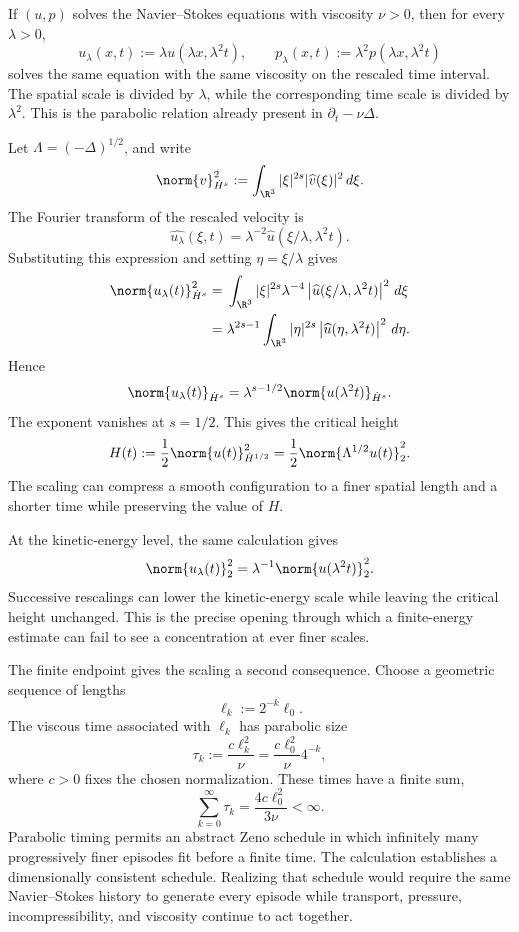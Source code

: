 If \((u,p)\) solves the Navier--Stokes equations with viscosity \(\nu>0\), then for every \(\lambda>0\),
\[
  u_\lambda(x,t)
  :=
  \lambda u(\lambda x,\lambda^2t),
  \qquad
  p_\lambda(x,t)
  :=
  \lambda^2p(\lambda x,\lambda^2t)
\]
solves the same equation with the same viscosity on the rescaled time interval.
The spatial scale is divided by \(\lambda\), while the corresponding time scale is divided by \(\lambda^2\).
This is the parabolic relation already present in \(\partial_t-\nu\Delta\).

Let \(\Lambda=(-\Delta)^{1/2}\), and write
\[
  \norm{v}_{\dot H^s}^2
  :=
  \int_{\R^3}
  |\xi|^{2s}|\widehat v(\xi)|^2
  \,d\xi.
\]
The Fourier transform of the rescaled velocity is
\[
  \widehat{u_\lambda}(\xi,t)
  =
  \lambda^{-2}
  \widehat u(\xi/\lambda,\lambda^2t).
\]
Substituting this expression and setting \(\eta=\xi/\lambda\) gives
\begin{align*}
  \norm{u_\lambda(t)}_{\dot H^s}^2
  &={}
  \int_{\R^3}
  |\xi|^{2s}\lambda^{-4}
  \left|\widehat u(\xi/\lambda,\lambda^2t)\right|^2
  \,d\xi
  \\
  &={}
  \lambda^{2s-1}
  \int_{\R^3}
  |\eta|^{2s}
  \left|\widehat u(\eta,\lambda^2t)\right|^2
  \,d\eta.
\end{align*}
Hence
\[
  \norm{u_\lambda(t)}_{\dot H^s}
  =
  \lambda^{s-1/2}
  \norm{u(\lambda^2t)}_{\dot H^s}.
\]
The exponent vanishes at \(s=1/2\).
This gives the critical height
\[
  H(t)
  :=
  \frac12\norm{u(t)}_{\dot H^{1/2}}^2
  =
  \frac12\norm{\Lambda^{1/2}u(t)}_2^2.
\]
The scaling can compress a smooth configuration to a finer spatial length and a shorter time while preserving the value of \(H\).

At the kinetic-energy level, the same calculation gives
\[
  \norm{u_\lambda(t)}_2^2
  =
  \lambda^{-1}
  \norm{u(\lambda^2t)}_2^2.
\]
Successive rescalings can lower the kinetic-energy scale while leaving the critical height unchanged.
This is the precise opening through which a finite-energy estimate can fail to see a concentration at ever finer scales.

The finite endpoint gives the scaling a second consequence.
Choose a geometric sequence of lengths
\[
  \ell_k
  :=
  2^{-k}\ell_0.
\]
The viscous time associated with \(\ell_k\) has parabolic size
\[
  \tau_k
  :=
  \frac{c\ell_k^2}{\nu}
  =
  \frac{c\ell_0^2}{\nu}4^{-k},
\]
where \(c>0\) fixes the chosen normalization.
These times have a finite sum,
\[
  \sum_{k=0}^{\infty}\tau_k
  =
  \frac{4c\ell_0^2}{3\nu}
  <
  \infty.
\]
Parabolic timing permits an abstract Zeno schedule in which infinitely many progressively finer episodes fit before a finite time.
The calculation establishes a dimensionally consistent schedule.
Realizing that schedule would require the same Navier--Stokes history to generate every episode while transport, pressure, incompressibility, and viscosity continue to act together.

